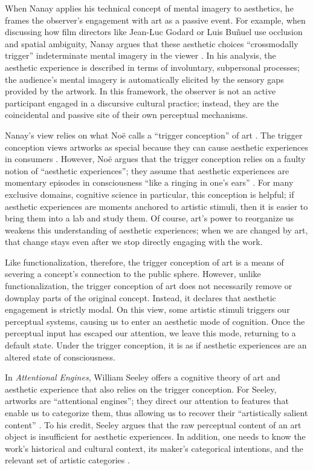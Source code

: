 \documentclass[12pt,letterpaper]{article}
\begin{document}
When Nanay applies his technical concept of mental imagery to aesthetics, he
frames the observer's engagement with art as a passive event. For example, when
discussing how film directors like Jean-Luc Godard or Luis Buñuel use occlusion
and spatial ambiguity, Nanay argues that these aesthetic choices ``crossmodally
trigger'' indeterminate mental imagery in the viewer
\autocite[242--243]{nanayMental2023}. In his analysis, the aesthetic experience
is described in terms of involuntary, subpersonal processes; the audience's
mental imagery is automatically elicited by the sensory gaps provided by the
artwork. In this framework, the observer is not an active participant engaged in
a discursive cultural practice; instead, they are the coincidental and passive
site of their own perceptual mechanisms.

Nanay's view relies on what Noë calls a ``trigger conception'' of art
\autocite[146]{noeEntanglement2023}. The trigger conception views artworks as
special because they can cause aesthetic experiences in consumers
\autocite[146]{noeEntanglement2023}. However, Noë argues that the trigger
conception relies on a faulty notion of ``aesthetic experiences''; they assume
that aesthetic experiences are momentary episodes in consciousness ``like a
ringing in one's ears'' \autocite[146]{noeEntanglement2023}. For many exclusive
domains, cognitive science in particular, this conception is helpful; if
aesthetic experiences are moments anchored to artistic stimuli, then it is
easier to bring them into a lab and study them. Of course, art's power to
reorganize us weakens this understanding of aesthetic experiences; when we are
changed by art, that change stays even after we stop directly engaging with the
work.

Like functionalization, therefore, the trigger conception of art is a means of
severing a concept's connection to the public sphere. However, unlike
functionalization, the trigger conception of art does not necessarily remove or
downplay parts of the original concept. Instead, it declares that aesthetic
engagement is strictly modal. On this view, some artistic stimuli triggers our
perceptual systems, causing us to enter an aesthetic mode of cognition. Once the
perceptual input has escaped our attention, we leave this mode, returning to a
default state. Under the trigger conception, it is as if aesthetic experiences
are an altered state of consciousness.

In \textit{Attentional Engines}, William Seeley offers a cognitive theory of art
and aesthetic experience that also relies on the trigger conception. For Seeley,
artworks are ``attentional engines''; they direct our attention to features that
enable us to categorize them, thus allowing us to recover their ``artistically
salient content'' \autocite[50]{seeleyAttentional2020}. To his credit, Seeley
argues that the raw perceptual content of an art object is insufficient for
aesthetic experiences. In addition, one needs to know the work's historical and
cultural context, its maker's categorical intentions, and the relevant set of
artistic categories \autocite[113-114, 49--50, 31]{seeleyAttentional2020}.
\end{document}
